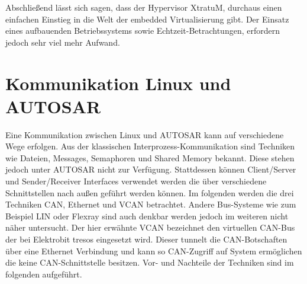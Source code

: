 \documentclass[
  a4paper,					    %
  twoside,
  DIV=calc,     				%
  bibliography=totoc,
  cleardoublepage=empty,
  ngerman,     					%
  final       					%
]{scrbook}
\begin{document}
Abschließend lässt sich sagen, dass der Hypervisor XtratuM, durchaus einen einfachen Einstieg in die Welt der embedded Virtualisierung gibt. Der Einsatz eines aufbauenden Betriebssystems sowie Echtzeit-Betrachtungen, erfordern jedoch sehr viel mehr Aufwand.




















\section{Kommunikation Linux und AUTOSAR}
\label{sec:Kommunikation_L_A}
Eine Kommunikation zwischen Linux und AUTOSAR kann auf verschiedene Wege erfolgen. Aus der klassischen Interprozess-Kommunikation sind Techniken wie Dateien, Messages, Semaphoren und Shared Memory bekannt. Diese stehen jedoch unter AUTOSAR nicht zur Verfügung. Stattdessen können Client/Server und Sender/Receiver Interfaces verwendet werden die über verschiedene Schnittstellen nach außen geführt werden können. Im folgenden werden die drei Techniken CAN, Ethernet und VCAN betrachtet. Andere Bus-Systeme wie zum Beispiel LIN oder Flexray sind auch denkbar werden jedoch im weiteren nicht näher untersucht. Der hier erwähnte VCAN bezeichnet den virtuellen CAN-Bus der bei Elektrobit tresos eingesetzt wird. Dieser tunnelt die CAN-Botschaften über eine Ethernet Verbindung und kann so CAN-Zugriff auf System ermöglichen die keine CAN-Schnittstelle besitzen. Vor- und Nachteile der Techniken sind im folgenden aufgeführt.
\end{document}

